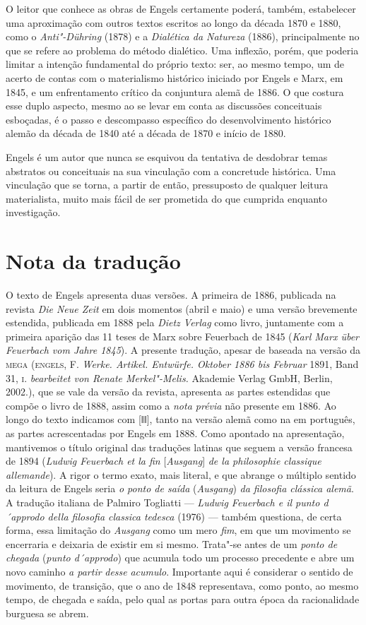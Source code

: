 O leitor que conhece as obras de Engels certamente poderá,
também, estabelecer uma aproximação com outros textos escritos ao longo
da década 1870 e 1880, como o \emph{Anti"-Dühring} (1878) e a
\emph{Dialética da Natureza} (1886), principalmente no que se refere ao
problema do método dialético. Uma inflexão, porém, que poderia limitar a
intenção fundamental do próprio texto: ser, ao mesmo tempo,
um de acerto de contas com o materialismo histórico iniciado por Engels e
Marx, em 1845, e um enfrentamento crítico da conjuntura alemã de 1886. O
que costura esse duplo aspecto, mesmo ao se levar em conta as discussões
conceituais esboçadas, é o passo e descompasso específico do
desenvolvimento histórico alemão da década de 1840 até a década de 1870
e início de 1880.

Engels é um autor que nunca se esquivou da tentativa de desdobrar temas
abstratos ou conceituais na sua vinculação com a concretude histórica.
Uma vinculação que se torna, a partir de então, pressuposto de qualquer
leitura materialista, muito mais fácil de ser prometida do que cumprida
enquanto investigação.

\pagebreak
\section*{Nota da tradução}

O texto de Engels apresenta duas versões. A primeira de 1886, publicada
na revista \emph{Die Neue Zeit} em dois momentos (abril e maio) e uma
versão brevemente estendida, publicada em 1888 pela \emph{Dietz Verlag}
como livro, juntamente com a primeira aparição das 11 teses de Marx
sobre Feuerbach de 1845 (\emph{Karl Marx über Feuerbach vom Jahre
1845}). A presente tradução, apesar de baseada na versão da
\textsc{mega} (\textsc{engels}, F. \emph{Werke. Artikel. Entwürfe.
Oktober 1886 bis Februar} 1891, Band 31, \textsc{i}. \emph{bearbeitet
von Renate Merkel"-Melis.} Akademie Verlag GmbH, Berlin, 2002.), que se
vale da versão da revista, apresenta as partes estendidas que compõe o
livro de 1888, assim como a \emph{nota prévia} não presente em 1886. Ao
longo do texto indicamos com {[}ǁǁ{]}, tanto na versão alemã como na em
português, as partes acrescentadas por Engels em 1888. Como apontado na
apresentação, mantivemos o título original das traduções latinas que
seguem a versão francesa de 1894 (\emph{Ludwig Feuerbach et la fin}
{[}\emph{Ausgang}{]} \emph{de la philosophie classique allemande}). A
rigor o termo exato, mais literal, e que abrange o múltiplo sentido da
leitura de Engels seria \emph{o ponto de saída} (\emph{Ausgang})
\emph{da filosofia clássica alemã}. A tradução italiana de Palmiro
Togliatti --- \emph{Ludwig Feuerbach e il punto d´approdo della filosofia
classica tedesca} (1976) --- também questiona, de certa forma, essa
limitação do \emph{Ausgang} como um mero \emph{fim}, em que um movimento
se encerraria e deixaria de existir em si mesmo. Trata"-se antes de um
\emph{ponto de chegada} (\emph{punto d´approdo}) que acumula todo um
processo precedente e abre um novo caminho \emph{a partir} \emph{desse}
\emph{acumulo}. Importante aqui é considerar o sentido de movimento, de
transição, que o ano de 1848 representava, como ponto, ao mesmo tempo,
de chegada e saída, pelo qual as portas para outra época da
racionalidade burguesa se abrem.
